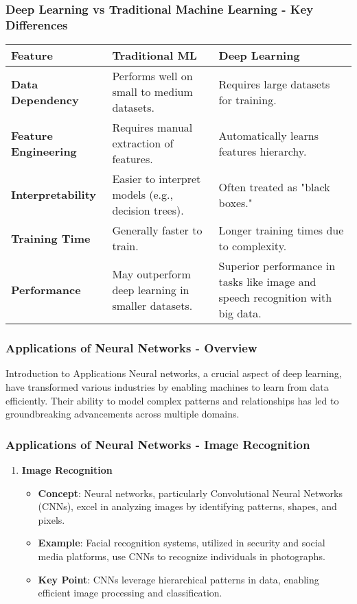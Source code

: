 \documentclass[aspectratio=169]{beamer}
\begin{document}
\begin{frame}[fragile]
  \frametitle{Deep Learning vs Traditional Machine Learning - Key Differences}
  \begin{table}[h]
    \centering
    \begin{tabular}{ | p{4cm} | p{4cm} | p{4cm} | }
      \hline
      \textbf{Feature} & \textbf{Traditional ML} & \textbf{Deep Learning} \\
      \hline
      \textbf{Data Dependency} & Performs well on small to medium datasets. & Requires large datasets for training. \\
      \hline
      \textbf{Feature Engineering} & Requires manual extraction of features. & Automatically learns features hierarchy. \\
      \hline
      \textbf{Interpretability} & Easier to interpret models (e.g., decision trees). & Often treated as "black boxes." \\
      \hline
      \textbf{Training Time} & Generally faster to train. & Longer training times due to complexity. \\
      \hline
      \textbf{Performance} & May outperform deep learning in smaller datasets. & Superior performance in tasks like image and speech recognition with big data. \\
      \hline
    \end{tabular}
  \end{table}
\end{frame}

\begin{frame}[fragile]
    \frametitle{Applications of Neural Networks - Overview}
    \begin{block}{Introduction to Applications}
        Neural networks, a crucial aspect of deep learning, have transformed various industries by enabling machines to learn from data efficiently. Their ability to model complex patterns and relationships has led to groundbreaking advancements across multiple domains.
    \end{block}
\end{frame}

\begin{frame}[fragile]
    \frametitle{Applications of Neural Networks - Image Recognition}
    \begin{enumerate}
        \item \textbf{Image Recognition}
        \begin{itemize}
            \item \textbf{Concept}: Neural networks, particularly Convolutional Neural Networks (CNNs), excel in analyzing images by identifying patterns, shapes, and pixels.
            \item \textbf{Example}: Facial recognition systems, utilized in security and social media platforms, use CNNs to recognize individuals in photographs.
            \item \textbf{Key Point}: CNNs leverage hierarchical patterns in data, enabling efficient image processing and classification.
        \end{itemize}
    \end{enumerate}
\end{frame}
\end{document}
